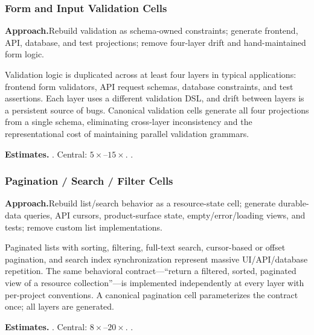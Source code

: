 \subsubsection{Form and Input Validation Cells}
\label{ssec:validation-cells}

\smallskip\noindent
\textbf{Approach.}\quad Rebuild validation as schema-owned constraints; generate frontend, API, database, and test projections; remove four-layer drift and hand-maintained form logic.

Validation logic is duplicated across at least four layers in typical
applications: frontend form validators, API request schemas, database
constraints, and test assertions.  Each layer uses a different validation
DSL, and drift between layers is a persistent source of bugs.  Canonical
validation cells generate all four projections from a single schema,
eliminating cross-layer inconsistency and the representational cost of
maintaining parallel validation grammars.

\smallskip\noindent
\textbf{Estimates.}\quad
{}.\quad
Central: $5\times$--$15\times$.\quad
{}.

\subsubsection{Pagination / Search / Filter Cells}
\label{ssec:pagination-cells}

\smallskip\noindent
\textbf{Approach.}\quad Rebuild list/search behavior as a resource-state cell; generate durable-data queries, API cursors, product-surface state, empty/error/loading views, and tests; remove custom list implementations.

Paginated lists with sorting, filtering, full-text search, cursor-based
or offset pagination, and search index synchronization represent massive
UI/API/database repetition.  The same behavioral contract---``return a
filtered, sorted, paginated view of a resource collection''---is
implemented independently at every layer with per-project conventions.
A canonical pagination cell parameterizes the contract once; all layers
are generated.

\smallskip\noindent
\textbf{Estimates.}\quad
{}.\quad
Central: $8\times$--$20\times$.\quad
{}.


